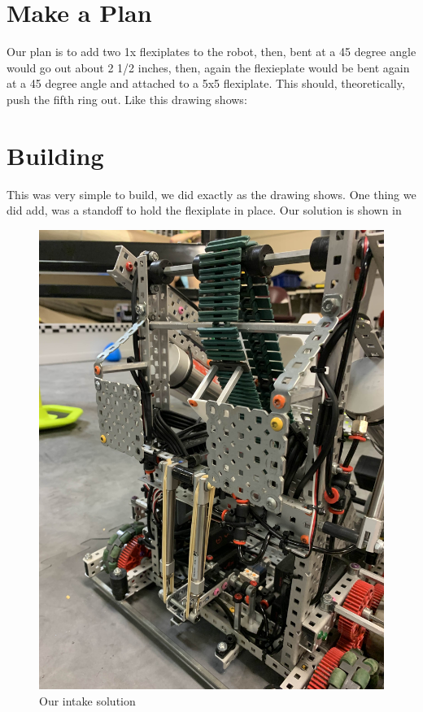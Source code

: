 \section*{Make a Plan}
Our plan is to add two 1x flexiplates to the robot, then, bent at a 45 degree angle would go out about 2 1/2 inches, then, again the flexieplate would be bent again at a 45 degree angle and attached to a 5x5 flexiplate. This should, theoretically, push the fifth ring out. Like this drawing shows:
\section*{Building}
This was very simple to build, we did exactly as the drawing shows. One thing we did add, was a standoff to hold the flexiplate in place. Our solution is shown in 
\begin{figure}[h!]
    \centering
    \includegraphics[width=0.5\linewidth]{images/Intake2.jpg}
    \caption{Our intake solution}
    \label{intake2}
\end{figure}
